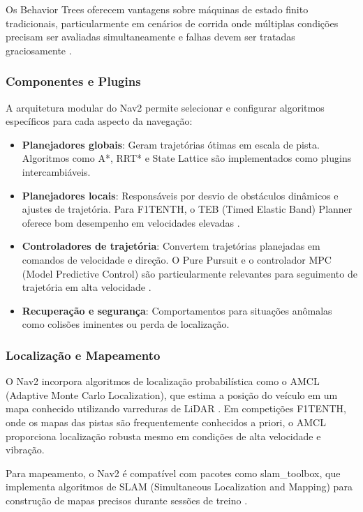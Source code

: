Os Behavior Trees oferecem vantagens sobre máquinas de estado finito
tradicionais, particularmente em cenários de corrida onde múltiplas condições
precisam ser avaliadas simultaneamente e falhas devem ser tratadas
graciosamente \cite{colledanchise2018behavior}.

\subsubsection{Componentes e Plugins}

A arquitetura modular do Nav2 permite selecionar e configurar algoritmos
específicos para cada aspecto da navegação:

\begin{itemize}
    \item \textbf{Planejadores globais}: Geram trajetórias ótimas em escala de pista. Algoritmos como A*, RRT* e State Lattice são implementados como plugins intercambiáveis.
    \item \textbf{Planejadores locais}: Responsáveis por desvio de obstáculos dinâmicos e ajustes de trajetória. Para F1TENTH, o TEB (Timed Elastic Band) Planner oferece bom desempenho em velocidades elevadas \cite{rosmann2017integrated}.
    \item \textbf{Controladores de trajetória}: Convertem trajetórias planejadas em comandos de velocidade e direção. O Pure Pursuit e o controlador MPC (Model Predictive Control) são particularmente relevantes para seguimento de trajetória em alta velocidade \cite{verschueren2016time}.
    \item \textbf{Recuperação e segurança}: Comportamentos para situações anômalas como colisões iminentes ou perda de localização.
\end{itemize}

\subsubsection{Localização e Mapeamento}

O Nav2 incorpora algoritmos de localização probabilística como o AMCL (Adaptive
Monte Carlo Localization), que estima a posição do veículo em um mapa conhecido
utilizando varreduras de LiDAR \cite{fox2003adapting}. Em competições F1TENTH,
onde os mapas das pistas são frequentemente conhecidos a priori, o AMCL
proporciona localização robusta mesmo em condições de alta velocidade e
vibração.

Para mapeamento, o Nav2 é compatível com pacotes como slam\_toolbox, que
implementa algoritmos de SLAM (Simultaneous Localization and Mapping) para
construção de mapas precisos durante sessões de treino
\cite{koide2019portable}.

